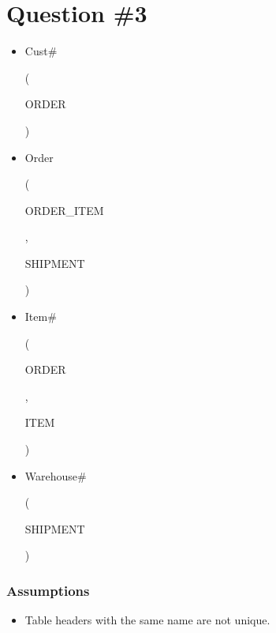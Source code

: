 \documentclass{article}
\begin{document}
\section*{Question \#3}
\begin{itemize}
    \item \begin{verb} Cust# \end{verb} (\begin{verb} ORDER \end{verb})
    \item \begin{verb} Order \end{verb} (\begin{verb} ORDER_ITEM \end{verb}, \begin{verb} SHIPMENT \end{verb})
    \item \begin{verb} Item# \end{verb} (\begin{verb} ORDER \end{verb}, \begin{verb} ITEM \end{verb})
    \item \begin{verb} Warehouse# \end{verb} (\begin{verb} SHIPMENT \end{verb})
\end{itemize}

\subsubsection*{Assumptions}
\begin{itemize}
    \item Table headers with the same name are not unique.
\end{itemize}
\end{document}
